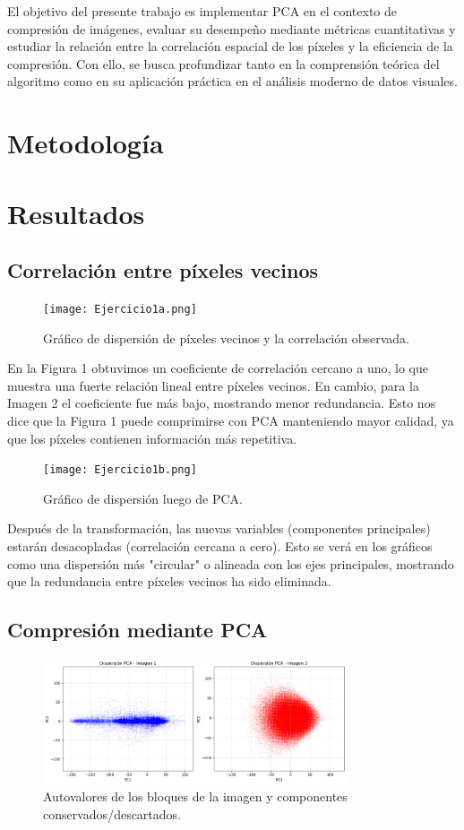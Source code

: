 \documentclass[12pt]{article}
\begin{document}
El objetivo del presente trabajo es implementar PCA en el contexto de compresión de imágenes, evaluar su desempeño mediante métricas cuantitativas y estudiar la relación entre la correlación espacial de los píxeles y la eficiencia de la compresión. Con ello, se busca profundizar tanto en la comprensión teórica del algoritmo como en su aplicación práctica en el análisis moderno de datos visuales.

\section{Metodología}

\section{Resultados}
\subsection{Correlación entre píxeles vecinos}
\begin{figure}[h!]
    \centering
    \texttt{[image: Ejercicio1a.png]}
    \caption{Gráfico de dispersión de píxeles vecinos y la correlación observada.}
\end{figure}

En la Figura 1 obtuvimos un coeficiente de correlación cercano a uno, lo que muestra una fuerte relación lineal entre píxeles vecinos. En cambio, para la Imagen 2 el coeficiente fue más bajo, mostrando menor redundancia. Esto nos dice que la Figura 1 puede comprimirse con PCA manteniendo mayor calidad, ya que los píxeles contienen información más repetitiva.

\begin{figure}[h!]
    \centering
    \texttt{[image: Ejercicio1b.png]}
    \caption{Gráfico de dispersión luego de PCA.}
\end{figure}

Después de la transformación, las nuevas variables (componentes principales) estarán desacopladas (correlación cercana a cero). Esto se verá en los gráficos como una dispersión más "circular" o alineada con los ejes principales, mostrando que la redundancia entre píxeles vecinos ha sido eliminada.

\subsection{Compresión mediante PCA}
\begin{figure}[h!]
    \centering
    \includegraphics[width=0.8\textwidth]{Ejercicio2.png}
    \caption{Autovalores de los bloques de la imagen y componentes conservados/descartados.}
\end{figure}
\end{document}
